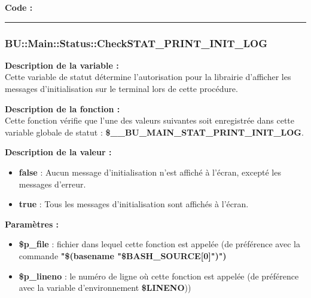 \documentclass[a4paper,10pt]{article}
\begin{document}
\begin{justify}
    \textbf{Code :}
\end{justify}



\color{blue}\par\noindent\rule{\textwidth}{0.4pt}\color{white}

\color{blue}
\subsubsection{\color{mauve}BU::Main::Status::CheckSTAT\_PRINT\_INIT\_LOG}\color{white}

\begin{justify}
    \textbf{Description de la variable :}\\
    Cette variable de statut détermine l'autorisation pour la librairie d'afficher les messages d'initialisation sur le terminal lors de cette procédure.
\end{justify}

\begin{justify}
    \textbf{Description de la fonction :}\\
    Cette fonction vérifie que l'une des valeurs suivantes soit enregistrée dans cette variable globale de statut : \textbf{\color{orange}\$\_\_BU\_MAIN\_STAT\_PRINT\_INIT\_LOG}.
\end{justify}

\begin{justify}
    \textbf{Description de la valeur :}

    \begin{itemize}
        \item \textbf{false} : Aucun message d'initialisation n'est affiché à l'écran, excepté les messages d'erreur.\\

        \item \textbf{true} : Tous les messages d'initialisation sont affichés à l'écran.
    \end{itemize}

\end{justify}

\begin{justify}
    \textbf{Paramètres :}

    \begin{itemize}
        \item \color{orange}\textbf{\$p\_file}\color{white} : fichier dans lequel cette fonction est appelée (de préférence avec la commande \textbf{"\$(\color{gray}basename \color{white}"\color{orange}\$BASH\_SOURCE[0]\color{white}")")}\\

        \item \color{orange}\textbf{\$p\_lineno}\color{white} : le numéro de ligne où cette fonction est appelée (de préférence avec la variable d'environnement \textbf{\color{orange}\$LINENO}))
    \end{itemize}
\end{justify}
\end{document}

